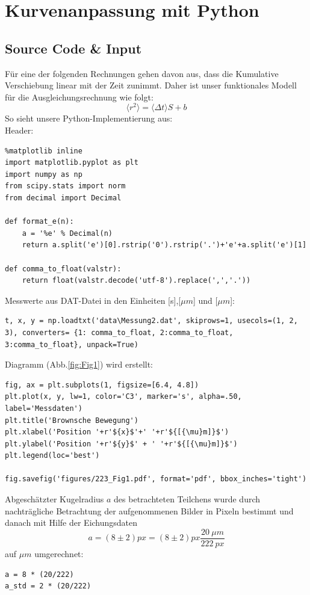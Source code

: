 \documentclass[a4paper,10pt]{article}
\begin{document}
\section{Kurvenanpassung mit Python}
\subsection{Source Code \& Input}
Für eine der folgenden Rechnungen gehen davon aus, dass die Kumulative Verschiebung linear mit der Zeit zunimmt.
Daher ist unser funktionales Modell für die Ausgleichungsrechnung wie folgt:
\begin{equation} \label{eq:Fit1}
	\boxed{\langle r^2 \rangle = \langle \Delta t \rangle S + b}
\end{equation} 
So sieht unsere Python-Implementierung aus:\\

Header:
\begin{lstlisting}
%matplotlib inline
import matplotlib.pyplot as plt
import numpy as np
from scipy.stats import norm
from decimal import Decimal

def format_e(n):
    a = '%e' % Decimal(n)
    return a.split('e')[0].rstrip('0').rstrip('.')+'e'+a.split('e')[1]

def comma_to_float(valstr):
    return float(valstr.decode('utf-8').replace(',','.'))

\end{lstlisting}

Messwerte aus DAT-Datei in den Einheiten [s],[\(\mu m\)] und [\(\mu m\)]:\begin{lstlisting}
t, x, y = np.loadtxt('data\Messung2.dat', skiprows=1, usecols=(1, 2, 3), converters= {1: comma_to_float, 2:comma_to_float, 3:comma_to_float}, unpack=True)

\end{lstlisting}

Diagramm (Abb.\ref{fig:Fig1}) wird erstellt:\begin{lstlisting}
fig, ax = plt.subplots(1, figsize=[6.4, 4.8])
plt.plot(x, y, lw=1, color='C3', marker='s', alpha=.50, label='Messdaten')
plt.title('Brownsche Bewegung')
plt.xlabel('Position '+r'${x}$'+' '+r'${[{\mu}m]}$')
plt.ylabel('Position '+r'${y}$' + ' '+r'${[{\mu}m]}$')
plt.legend(loc='best')

fig.savefig('figures/223_Fig1.pdf', format='pdf', bbox_inches='tight')

\end{lstlisting}
Abgeschätzter Kugelradius \(a\) des betrachteten Teilchens wurde durch nachträgliche Betrachtung der aufgenommenen Bilder in Pixeln bestimmt  und danach mit Hilfe der Eichungsdaten 
\[a= (8\pm2)px = (8\pm2)px \frac{20\:\mu m}{222\: px}\]
auf \(\mu m\) umgerechnet: \begin{lstlisting}
a = 8 * (20/222)
a_std = 2 * (20/222)

\end{lstlisting}
\end{document}
